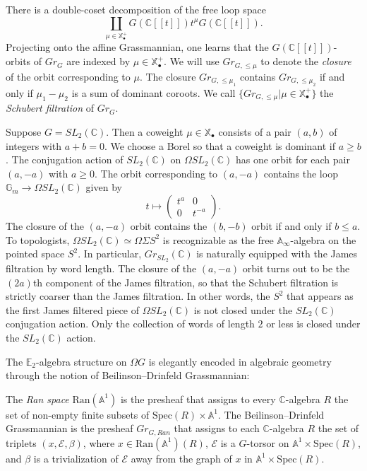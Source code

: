 There is a double-coset decomposition of the free loop space
$$
\coprod_{\mu \in \mathbb{X}_{\bullet}^+} G(\mathbb{C}[[t]]) t^{\mu} G(\mathbb{C}[[t]]).
$$
Projecting onto the affine Grassmannian, one learns that the $G(\mathbb{C}[[t]])$-orbits of $Gr_G$ are indexed by $\mu \in \mathbb{X}_{\bullet}^+$.  We will use $Gr_{G,\le \mu}$ to denote the \textit{closure} of the orbit corresponding to $\mu$.  The closure $Gr_{G, \le \mu_1}$ contains $Gr_{G, \le \mu_2}$ if and only if $\mu_1-\mu_2$ is a sum of dominant coroots.  We call $\{Gr_{G,\le \mu}|\mu \in \mathbb{X}^+_{\bullet}\}$ the \textit{Schubert filtration} of $Gr_G$.

\begin{exm} \label{sl2example}
Suppose $G=SL_2(\mathbb{C})$.  Then a coweight $\mu \in \mathbb{X}_\bullet$ consists of a pair $(a,b)$ of integers with $a+b=0$.  We choose a Borel so that a coweight is dominant if $a \ge b$.  The conjugation action of $SL_2(\mathbb{C})$ on $\Omega SL_2(\mathbb{C})$ has one orbit for each pair $(a,-a)$ with $a \ge 0$.  The orbit corresponding to $(a,-a)$ contains the loop $\mathbb{G}_m \rightarrow \Omega SL_2(\mathbb{C})$ given by
$$
t \mapsto \left( \begin{array}{cc} t^a & 0 \\ 0 & t^{-a}  \end{array} \right).
$$
The closure of the $(a,-a)$ orbit contains the $(b,-b)$ orbit if and only if $b \le a$.  To topologists, $\Omega SL_2(\mathbb{C}) \simeq \Omega \Sigma S^2$ is recognizable as the free $\mathbb{A}_\infty$-algebra on the pointed space $S^2$.  In particular, $Gr_{SL_2}(\mathbb{C})$ is naturally equipped with the James filtration by word length.  The closure of the $(a,-a)$ orbit turns out to be the $(2a)$th component of the James filtration, so that the Schubert filtration is strictly coarser than the James filtration.  In other words, the $S^2$ that appears as the first James filtered piece of $\Omega SL_2(\mathbb{C})$ is not closed under the $SL_2(\mathbb{C})$ conjugation action.  Only the collection of words of length $2$ or less is closed under the $SL_2(\mathbb{C})$ action. 
\end{exm}

The $\mathbb{E}_2$-algebra structure on $\Omega G$ is elegantly encoded in algebraic geometry through the notion of Beilinson--Drinfeld Grassmannian:

\begin{dfn}
The \textit{Ran space} $\text{Ran}(\mathbb{A}^1)$ is the presheaf that assigns to every $\mathbb{C}$-algebra $R$ the set of non-empty finite subsets of $\text{Spec}(R) \times \mathbb{A}^1$.   The Beilinson--Drinfeld Grassmannian is the presheaf $Gr_{G,Ran}$ that assigns to each $\mathbb{C}$-algebra $R$ the set of triplets $(x,\mathcal{E},\beta)$, where $x \in \text{Ran}(\mathbb{A}^1)(R)$, $\mathcal{E}$ is a $G$-torsor on $\mathbb{A}^1 \times \text{Spec}(R)$, and $\beta$ is a trivialization of $\mathcal{E}$ away from the graph of $x$ in $\mathbb{A}^1 \times \text{Spec}(R)$.
\end{dfn}

